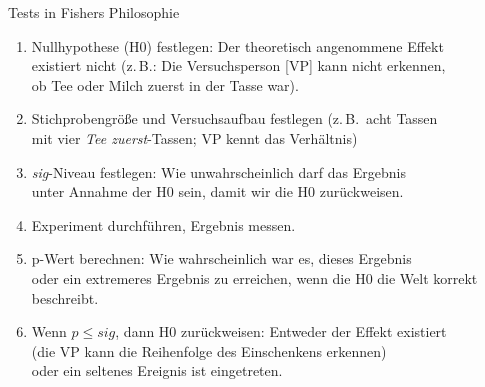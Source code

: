 \begin{frame}
  {Tests in Fishers Philosophie}
  \begin{enumerate}
    \item \alert{Nullhypothese} (H0) festlegen: Der theoretisch angenommene Effekt\\
      existiert \alert{nicht} (z.\,B.: Die Versuchsperson [VP] kann \alert{nicht} erkennen,\\
      ob Tee oder Milch zuerst in der Tasse war).
    \item \alert{Stichprobengröße} und \alert{Versuchsaufbau} festlegen (z.\,B.\ acht Tassen\\
      mit vier \textit{Tee zuerst}-Tassen; VP kennt das Verhältnis)
    \item \alert{\textit{sig}-Niveau} festlegen: Wie unwahrscheinlich darf das Ergebnis\\
      unter Annahme der H0 sein, damit wir die H0 zurückweisen.
    \item Experiment durchführen, Ergebnis messen.
    \item \alert{p-Wert} berechnen: Wie wahrscheinlich \alert{war} es, dieses Ergebnis\\
      oder ein extremeres Ergebnis zu erreichen, wenn die H0 die Welt korrekt beschreibt.
    \item Wenn \alert{$p\leq sig$}, dann H0 zurückweisen: Entweder der Effekt existiert\\
      (\zB die VP kann die Reihenfolge des Einschenkens erkennen)\\
      \alert{oder ein seltenes Ereignis ist eingetreten}.
  \end{enumerate}
\end{frame}

